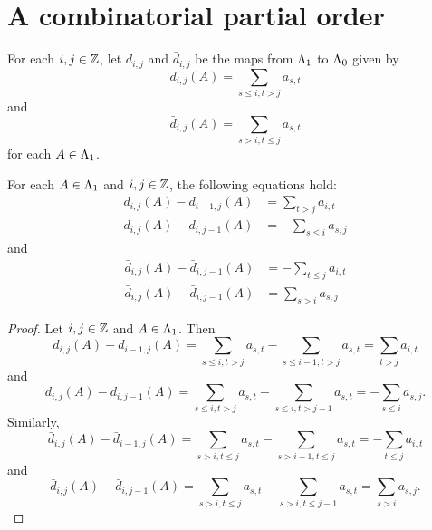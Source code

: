 \documentclass[a4paper, 11pt]{report}
\begin{document}
\section{A combinatorial partial order}

For each $i,j\in\mathbb{Z}$, let $d_{i,j}$ and $\bar{d}_{i,j}$ be the maps from $\Lambda_1{}$ to $\Lambda_0{}$ given by
\begin{equation*}
d_{i,j}{(A)} = \sum_{s\le i,t>j} a_{s,t}
\end{equation*}
and
\begin{equation*}
\bar{d}_{i,j}{(A)} = \sum_{s>i, t\le j} a_{s,t}
\end{equation*}
for each $A\in\Lambda_1{}$.

\begin{lemma}\label{lemma:differentials}
For each $A\in\Lambda_1{}$ and $i,j\in\mathbb{Z}$, the following equations hold:
\begin{align*}
d_{i,j}{(A)} - d_{i-1,j}{(A)} &= \sum_{t>j}a_{i,t}\\
d_{i,j}{(A)}-d_{i,j-1}{(A)} &= - \sum_{s\le i}a_{s,j}
\end{align*}
and
\begin{align*}
\bar{d}_{i,j}{(A)} - \bar{d}_{i,j-1}{(A)} &= -\sum_{t\le j} a_{i,t}\\
\bar{d}_{i,j}{(A)} - \bar{d}_{i,j-1}{(A)} &= \sum_{s>i} a_{s,j}
\end{align*}
\end{lemma}

\begin{proof}
Let $i,j\in\mathbb{Z}$ and $A\in\Lambda_1{}$. Then
\begin{equation*}
d_{i,j}{(A)} - d_{i-1,j}{(A)} = \sum_{s\le i,t>j}a_{s,t} - \sum_{s\le i-1,t>j}a_{s,t} = \sum_{t>j}a_{i,t}
\end{equation*}
and
\begin{equation*}
d_{i,j}{(A)}-d_{i,j-1}{(A)} = \sum_{s\le i,t>j}a_{s,t} - \sum_{s\le i,t>j-1}a_{s,t} = -\sum_{s\le i}a_{s,j}.
\end{equation*}
Similarly,
\begin{equation*}
\bar{d}_{i,j}{(A)} - \bar{d}_{i-1,j}{(A)} = \sum_{s>i,t\le j} a_{s,t} - \sum_{s>i-1,t\le j} a_{s,t} = -\sum_{t\le j} a_{i,t}
\end{equation*}
and
\begin{equation*}
\bar{d}_{i,j}{(A)} - \bar{d}_{i,j-1}{(A)} = \sum_{s>i,t\le j} a_{s,t} - \sum_{s>i,t\le j-1} a_{s,t} = \sum_{s>i} a_{s,j}.
\end{equation*}
\end{proof}
\end{document}
